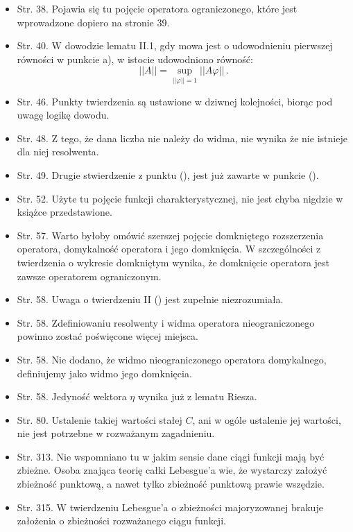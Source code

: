 \documentclass[a4paper,11pt]{article}
\begin{document}
\begin{itemize}
\item Str. 38. Pojawia się tu pojęcie operatora ograniczonego, które
  jest wprowadzone dopiero na stronie 39.
\item Str. 40. W dowodzie lematu II.1, gdy mowa jest o udowodnieniu
  pierwszej równości w punkcie a), w istocie udowodniono równość:
  $$|| A || = \sup_{ || \varphi || = 1 } || A \varphi || \, .$$
\item Str. 46. Punkty twierdzenia są ustawione w dziwnej kolejności,
  biorąc pod uwagę logikę dowodu.
\item Str. 48. Z tego, że dana liczba nie należy do widma, nie wynika
  że nie istnieje dla niej resolwenta.
\item Str. 49. Drugie stwierdzenie z punktu (), jest już
  zawarte w punkcie ().
\item Str. 52. Użyte tu pojęcie funkcji charakterystycznej, nie jest
  chyba nigdzie w książce przedstawione.
\item Str. 57. Warto byłoby omówić szerszej pojęcie domkniętego
  rozszerzenia operatora, domykalność operatora i jego domknięcia. W
  szczególności z twierdzenia o wykresie domkniętym wynika, że
  domknięcie operatora jest zawsze operatorem ograniczonym.
\item Str. 58. Uwaga o twierdzeniu II () jest zupełnie
  niezrozumiała.
\item Str. 58. Zdefiniowaniu resolwenty i widma operatora
  nieograniczonego powinno zostać poświęcone więcej miejsca.
\item Str. 58. Nie dodano, że widmo nieograniczonego operatora
  domykalnego, definiujemy jako widmo jego domknięcia.
\item Str. 58. Jedyność wektora $\eta$ wynika już z lematu Riesza.
\item Str. 80. Ustalenie takiej wartości stałej $C$, ani w ogóle
  ustalenie jej wartości, nie jest potrzebne w rozważanym zagadnieniu.
\item Str. 313. Nie wspomniano tu w jakim sensie dane ciągi funkcji
  mają być zbieżne. Osoba znająca teorię całki Lebesgue'a wie, że
  wystarczy założyć zbieżność punktową, a nawet tylko zbieżność
  punktową prawie wszędzie.
\item Str. 315. W twierdzeniu Lebesgue'a o zbieżności majoryzowanej
  brakuje założenia o zbieżności rozważanego ciągu funkcji.
\end{itemize}

\end{document}
